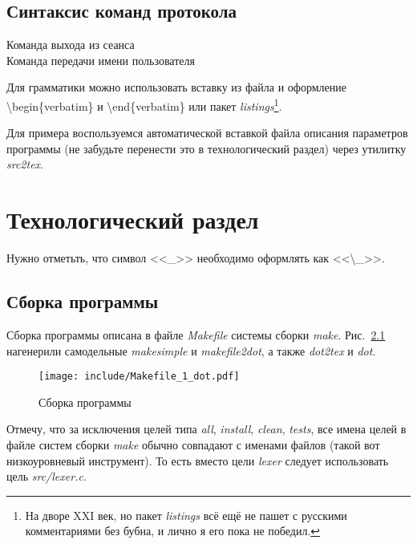 \documentclass[a4paper,12pt]{report}
\begin{document}
\section{Синтаксис команд протокола}

\begin{description}
\item[Команда выхода из сеанса]

\item[Команда передачи имени пользователя]

\end{description}

Для грамматики можно использовать вставку из файла и оформление \textbackslash{}begin\{verbatim\} и \textbackslash{}end\{verbatim\} или пакет \textit{listings}\footnote{На дворе XXI век, но пакет \textit{listings} всё ещё не пашет с русскими комментариями без бубна, и лично я его пока не победил.}.

Для примера воспользуемся автоматической вставкой файла описания параметров программы (не забудьте перенести это в технологический раздел) через утилитку \textit{src2tex}.


% 

\chapter{Технологический раздел}

Нужно отметьть, что символ <<\_>> необходимо оформлять как <<\textbackslash\_>>.

\section{Сборка программы}

Сборка программы описана в файле \textit{Makefile} системы сборки \textit{make}. Рис.~\ref{fig:make} нагенерили самодельные \textit{makesimple} и \textit{makefile2dot}, а также \textit{dot2tex} и \textit{dot}.

\begin{figure}
\centering
\texttt{[image: include/Makefile\_1\_dot.pdf]}
\caption{Сборка программы}
\label{fig:make}
\end{figure}

Отмечу, что за исключения целей типа \textit{all}, \textit{install}, \textit{clean}, \textit{tests}, все имена целей в файле систем сборки \textit{make} обычно совпадают с именами файлов (такой вот низкоуровневый инструмент). То есть вместо цели \textit{lexer} следует использовать цель \textit{src/lexer.c}.
\end{document}
